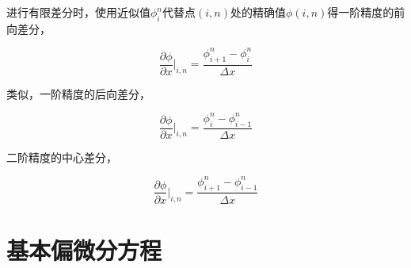 进行有限差分时，使用近似值$ \phi_i^n $代替点$ (i,n) $处的精确值$ \phi(i,n) $得一阶精度的前向差分，

\begin{equation}
\frac{\partial\phi}{\partial x}|_{i,n} = 
\frac{\phi_{i+1}^n-\phi_i^n}{\Delta x}
\end{equation}

类似，一阶精度的后向差分，

\begin{equation}
\frac{\partial\phi}{\partial x}|_{i,n} = 
\frac{\phi_i^n-\phi_{i-1}^n}{\Delta x}
\end{equation}

二阶精度的中心差分，

\begin{equation}
\frac{\partial\phi}{\partial x}|_{i,n} = 
\frac{\phi_{i+1}^n-\phi_{i-1}^n}{\Delta x}
\end{equation}

\section{基本偏微分方程}













